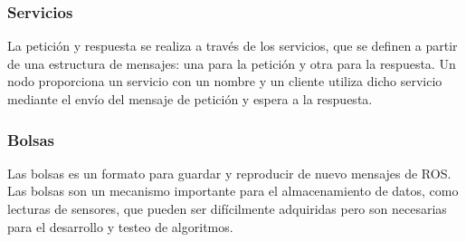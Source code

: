 \documentclass[12pt,a4paper]{article}
\begin{document}
\subsubsection{Servicios}
La petición y respuesta se realiza a través de los servicios, que se definen a partir de una estructura de mensajes: una para la petición y otra para la respuesta. Un nodo proporciona un servicio con un nombre y un cliente utiliza dicho servicio mediante el envío del mensaje de petición y espera a la respuesta.
\subsubsection{Bolsas} 
Las bolsas es un formato para guardar y reproducir de nuevo mensajes de ROS. Las bolsas son un mecanismo importante para el almacenamiento de datos, como lecturas de sensores, que pueden ser difícilmente adquiridas pero son necesarias para el desarrollo y testeo de algoritmos.
\end{document}
